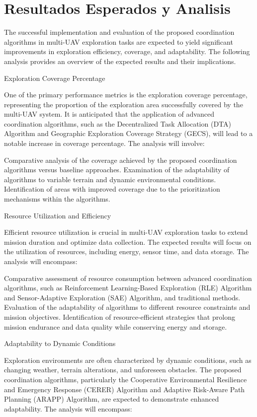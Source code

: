\documentclass[sigconf]{acmart}
\begin{document}
\section{Resultados Esperados y Analisis}

The successful implementation and evaluation of the proposed coordination algorithms in multi-UAV exploration tasks are expected to yield significant improvements in exploration efficiency, coverage, and adaptability. The following analysis provides an overview of the expected results and their implications.

Exploration Coverage Percentage

One of the primary performance metrics is the exploration coverage percentage, representing the proportion of the exploration area successfully covered by the multi-UAV system. It is anticipated that the application of advanced coordination algorithms, such as the Decentralized Task Allocation (DTA) Algorithm and Geographic Exploration Coverage Strategy (GECS), will lead to a notable increase in coverage percentage. The analysis will involve:

    Comparative analysis of the coverage achieved by the proposed coordination algorithms versus baseline approaches.
    Examination of the adaptability of algorithms to variable terrain and dynamic environmental conditions.
    Identification of areas with improved coverage due to the prioritization mechanisms within the algorithms.

Resource Utilization and Efficiency

Efficient resource utilization is crucial in multi-UAV exploration tasks to extend mission duration and optimize data collection. The expected results will focus on the utilization of resources, including energy, sensor time, and data storage. The analysis will encompass:

    Comparative assessment of resource consumption between advanced coordination algorithms, such as Reinforcement Learning-Based Exploration (RLE) Algorithm and Sensor-Adaptive Exploration (SAE) Algorithm, and traditional methods.
    Evaluation of the adaptability of algorithms to different resource constraints and mission objectives.
    Identification of resource-efficient strategies that prolong mission endurance and data quality while conserving energy and storage.

Adaptability to Dynamic Conditions

Exploration environments are often characterized by dynamic conditions, such as changing weather, terrain alterations, and unforeseen obstacles. The proposed coordination algorithms, particularly the Cooperative Environmental Resilience and Emergency Response (CERER) Algorithm and Adaptive Risk-Aware Path Planning (ARAPP) Algorithm, are expected to demonstrate enhanced adaptability. The analysis will encompass:
\end{document}
